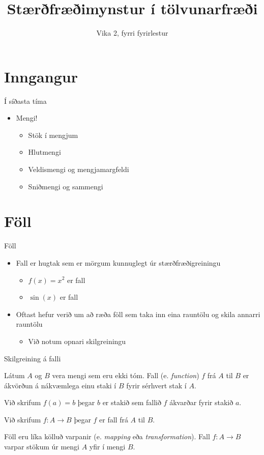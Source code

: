 \documentclass{beamer}
\title{Stærðfræðimynstur í tölvunarfræði}
\subtitle{Vika 2, fyrri fyrirlestur}
\begin{document}
\begin{frame}
\titlepage
\end{frame}

\section{Inngangur}

\begin{frame}{Í síðasta tíma}
\begin{itemize}
 \item Mengi!
 \begin{itemize}
  \item Stök í mengjum
  \item Hlutmengi
  \item Veldismengi og mengjamargfeldi
  \item Sniðmengi og sammengi
 \end{itemize}
\end{itemize}
\end{frame}

\section{Föll}

\begin{frame}{Föll}
\begin{itemize}
 \item Fall er hugtak sem er mörgum kunnuglegt úr stærðfræðigreiningu
 \begin{itemize}
  \item $f(x) = x^2$ er fall
  \item $\sin(x)$ er fall
 \end{itemize}
 \item Oftast hefur verið um að ræða föll sem taka inn eina rauntölu og skila annarri rauntölu
 \begin{itemize}
  \item Við notum opnari skilgreiningu
 \end{itemize}
\end{itemize}
\end{frame}

\begin{frame}{Skilgreining á falli}
\begin{tcolorbox}[title=Fall]
Látum $A$ og $B$ vera mengi sem eru ekki tóm. Fall (e. \emph{function}) $f$ frá $A$ til $B$ er ákvörðun á nákvæmlega einu staki í $B$ fyrir sérhvert stak í $A$.

Við skrifum $f(a) = b$ þegar $b$ er stakið sem fallið $f$ ákvarðar fyrir stakið $a$.

Við skrifum $f: A \to B$ þegar $f$ er fall frá $A$ til $B$.
\end{tcolorbox}

Föll eru líka kölluð varpanir (e. \emph{mapping} eða \emph{transformation}). Fall $f: A \to B$ varpar stökum úr mengi $A$ yfir í mengi $B$.
\end{frame}
\end{document}
